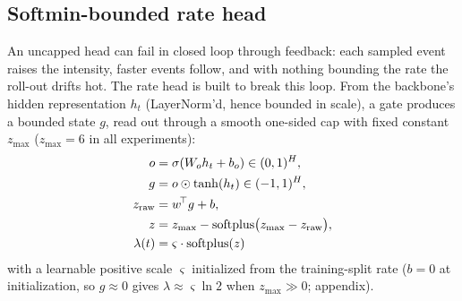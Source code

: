 \subsection{Softmin-bounded rate head}
An uncapped head can fail in closed loop through feedback: each sampled
event raises the intensity, faster events follow, and with nothing bounding
the rate the roll-out drifts hot. The rate head is built to break this
loop. From the backbone's hidden representation $h_t$ (LayerNorm'd, hence
bounded in scale), a gate produces a bounded state $g$, read out through a
smooth one-sided cap with fixed constant $z_{\max}$ ($z_{\max}{=}6$ in all
experiments):
\begin{align}
o &= \sigma(W_o h_t + b_o)\in(0,1)^H,\notag\\
g &= o\odot\tanh(h_t)\in(-1,1)^H,\notag\\
z_{\mathrm{raw}} &= w^{\!\top}g+b,\notag\\
z &= z_{\max}-\mathrm{softplus}\bigl(z_{\max}-z_{\mathrm{raw}}\bigr),\notag\\
\lambda(t) &= \varsigma\cdot\mathrm{softplus}(z)\notag
\end{align}
with a learnable positive scale $\varsigma$ initialized from the
training-split rate ($b=0$ at initialization, so $g\!\approx\!0$ gives
$\lambda\approx\varsigma\ln 2$ when $z_{\max}\!\gg\!0$; appendix).

